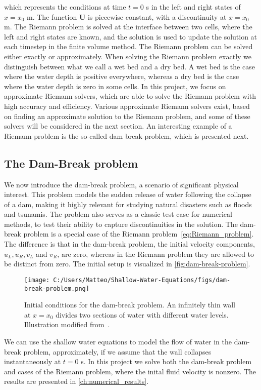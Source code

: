 which represents the conditions at time $t = 0$ s in the left and right states of $x = x_0$ m.
The function $\mathbf{U}$ is piecewise constant, with a discontinuity at $x = x_0$ m.
The Riemann problem is solved at the interface between two cells, where the left and right states are known, and the solution is used to update the solution at each timestep in the finite volume method.
The Riemann problem can be solved either exactly or approximately.
When solving the Riemann problem exactly we distinguish between what we call a wet bed and a dry bed.
A wet bed is the case where the water depth is positive everywhere, whereas a dry bed is the case where the water depth is zero in some cells.
In this project, we focus on approximate Riemann solvers, which are able to solve the Riemann problem with high accuracy and efficiency.
Various approximate Riemann solvers exist, based on finding an approximate solution to the Riemann problem, and some of these solvers will be considered in the next section.
An interesting example of a Riemann problem is the so-called dam break problem, which is presented next.

\subsection{The Dam-Break problem}
We now introduce the dam-break problem, a scenario of significant physical interest.
This problem models the sudden release of water following the collapse of a dam, making it highly relevant for studying natural disasters such as floods and tsunamis.
The problem also serves as a classic test case for numerical methods, to test their ability to capture discontinuities in the solution.
The dam-break problem is a special case of the Riemann problem~\eqref{eq:Riemann_problem}.
The difference is that in the dam-break problem, the initial velocity components, $u_L, u_R, v_L$ and $v_R$, are zero, whereas in the Riemann problem they are allowed to be distinct from zero.
The initial setup is visualized in \autoref{fig:dam-break-problem}.
\begin{figure}[H]
    \centering
    \texttt{[image: C:/Users/Matteo/Shallow-Water-Equations/figs/dam-break-problem.png]}
    \caption{Initial conditions for the dam-break problem. An infinitely thin wall at $x=x_0$ divides two sections of water with different water levels. Illustration modified from~\cite{Toro2024}.}\label{fig:dam-break-problem}
\end{figure} 
We can use the shallow water equations to model the flow of water in the dam-break problem, approximately, if we assume that the wall collapses instantaneously at $t=0$ s.
In this project we solve both the dam-break problem and cases of the Riemann problem, where the inital fluid velocity is nonzero.
The results are presented in \autoref{ch:numerical_results}.

